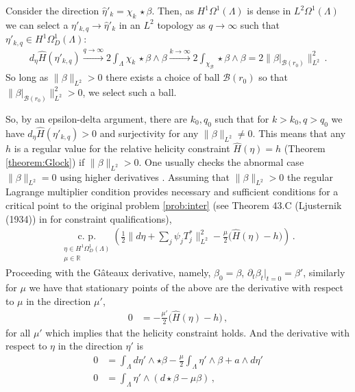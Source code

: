 \documentclass[11pt]{article}
\theoremstyle{plain}
\theoremstyle{definition}
\theoremstyle{remark}
\newcommand{\R}{\mathbb{R}}
\newcommand{\B}{\mathcal{B}}
\newcommand{\ST}{\Lambda}
\begin{document}
Consider the direction \(\hat \eta'_k = \chi_k  \, \star \beta\). Then, as \(H^1 \Omega^1(\ST)\) is dense in \(L^2 \Omega^1(\ST)\) we can select a \(\eta'_{k,q} \to  \hat \eta'_k \) in an \(L^2\) topology as \(q \to \infty\) such that \(\eta'_{k,q} \in H^1 \Omega^1_D (\ST)\):
\begin{align*}
    d_{\eta} \hat H (\eta'_{k,q}) 
    \xrightarrow{q \to \infty}
    2\int_{\ST} \! \chi_k  \, \star \beta  \wedge \beta   \xrightarrow{k \to \infty} 2 \int_{\chi_{\B}} \! \star \beta  \wedge \beta 
    = 2 \| \beta |_{\B(r_0)} \|_{L^2}^2   
     \, .
\end{align*}
So long as \(\| \beta \|_{L^2} > 0\) there exists a choice of ball \(\B(r_0)\) so that \( \| \beta |_{\B(r_0)} \|_{L^2}^2  > 0 \), we select such a ball. 


So, by an epsilon-delta argument, there are \(k_0,q_0\) such that for \(k > k_0, q>q_0\) we have \(d_{\eta} \hat H (\eta'_{k,q}) > 0\) and surjectivity for any \( \| \beta \|_{L^2}  \neq 0\). This means that any \( h \) is a regular value for the relative helicity constraint \(\hat H (\eta) =  h \) (Theorem \ref{theorem:Glock}) if \(\| \beta \|_{L^2} > 0\). One usually checks the abnormal case \(\| \beta \|_{L^2} = 0\) using higher derivatives \cite{tret1984necessary}. Assuming that \(\| \beta \|_{L^2} > 0\) the regular Lagrange multiplier condition provides necessary and sufficient conditions for a critical point to the original problem \eqref{prob:inter} (see Theorem 43.C (Ljusternik (1934)) in \cite{Lys} for constraint qualifications),
\begin{align*}
    \underset{\substack{\eta \in  H^1 \Omega^1_D(\ST) \\  \mu \in \R} }{ \text{c. p.} }  \left(  \frac{1}{2} \Big\|d \eta + \sum_j  \psi_{j}  T_{j}^*  \Big\|_{L^2}^2   - \frac{\mu}{2} \big(   \hat H (\eta) -   h       \big) \right) \, .
\end{align*}
Proceeding with the Gâteaux derivative, namely, \(\beta_0 = \beta \), \(\partial_t \beta_t |_{t=0} =  \beta' \), similarly for \(\mu\) we have that stationary points of the above are the derivative with respect to \(\mu\) in the direction \(\mu'\),
\begin{align*}
    0 &=    - \frac{\mu'}{2} \big(   \hat H (\eta) -   h       \big) \, ,
\end{align*}
for all \(\mu'\) which implies that the helicity constraint holds. And the derivative with respect to \(\eta\) in the direction \(\eta'\) is
\begin{align*}
      0 &= \int_{\ST} d \eta' \wedge \star \beta   - \frac{\mu}{2} \int_{\ST} \eta'  \wedge \beta + a \wedge d \eta'  \\
      0 &= \int_{\ST} \eta' \wedge (d\star \beta  - \mu \beta ) \, ,
\end{align*}
\end{document}
